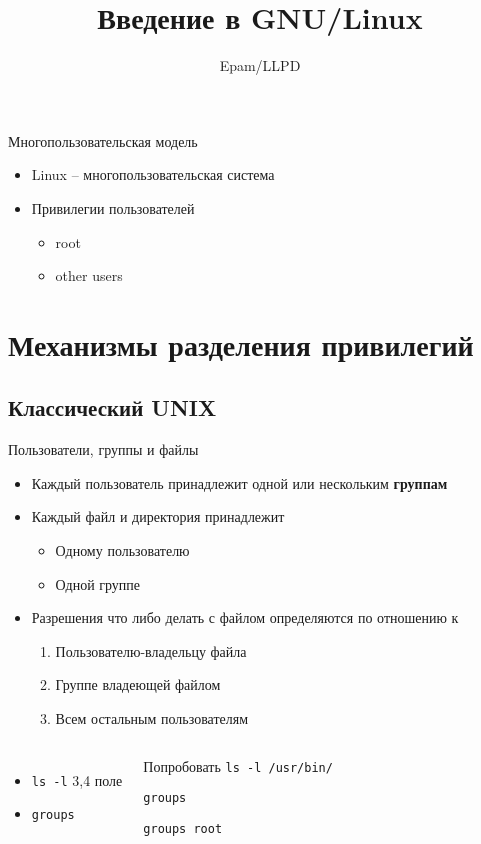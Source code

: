 \documentclass[ignorenonframetext, professionalfonts, hyperref={pdftex, unicode}]{beamer}
\title{Введение в GNU/Linux}
\author{Epam/LLPD}
\begin{document}
\frame{
	\frametitle{}
	\titlepage
	\vspace{-0.5cm}
	\begin{center}
	\end{center}
}
\frame{
	\tableofcontents
}
\begin{frame}{Многопользовательская модель}   
 \begin{itemize}
   \item Linux -- многопользовательская система
   \item Привилегии пользователей
     \begin{itemize}
       \item root
       \item other users
      \end{itemize}
     \end{itemize}
\end{frame}
\section{Механизмы разделения привилегий}
\subsection{Классический UNIX}
\begin{frame}{Пользователи, группы и файлы}
\begin{itemize}
  \item Каждый пользователь принадлежит одной или нескольким \textbf{группам}
  \item Каждый файл и директория принадлежит
    \begin{itemize}
      \item Одному пользователю 
      \item Одной группе
    \end{itemize}
  \pause
  \item  Разрешения что либо делать с файлом определяются по отношению к
    \begin{enumerate}
      \item Пользователю-владельцу файла
      \item Группе владеющей файлом
      \item Всем остальным пользователям
    \end{enumerate}

\end{itemize}
\pause
\begin{columns}
  \begin{itemize}
    \item {\tt ls -l} 3,4 поле 
    \item {\tt groups}
   \end{itemize}
  \begin{block}{Попробовать}
    {\tt ls -l /usr/bin/}

    {\tt groups}

    {\tt groups root}
  \end{block}
\end{columns}
\end{frame}
\end{document}
